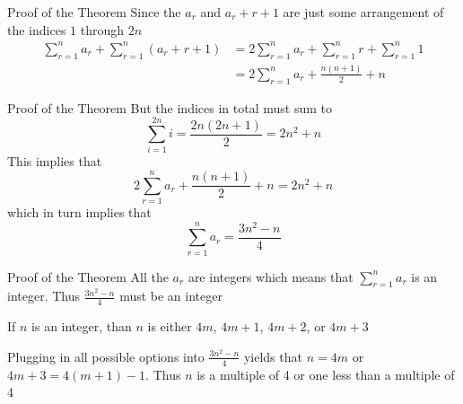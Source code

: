 \documentclass[aspectratio=169, handout]{beamer}
\begin{document}
\begin{frame}{Proof of the Theorem}
    Since the $a_r$ and $a_r + r + 1$ are just some arrangement of the indices $1$ through $2n$
    \begin{align*}
        \sum_{r = 1}^n a_r + \sum_{r = 1}^n (a_r + r + 1) &= 2 \sum_{r = 1}^n a_r + \sum_{r = 1}^n r + \sum_{r = 1}^n 1 \\
        &= 2 \sum_{r = 1}^n a_r + \frac{n(n + 1)}{2} + n
    \end{align*}
\end{frame}

\begin{frame}{Proof of the Theorem}
    But the indices in total must sum to
    \[
        \sum_{i = 1}^{2n} i = \frac{2n(2n + 1)}{2} = 2n^2 + n
    \] \pause
    This implies that
    \[
        2 \sum_{r = 1}^n a_r + \frac{n(n + 1)}{2} + n = 2n^2 + n
    \] \pause
    which in turn implies that
    \[
        \sum_{r = 1}^n a_r = \frac{3n^2 - n}{4}
    \]
\end{frame}

\begin{frame}{Proof of the Theorem}
    All the $a_r$ are integers which means that $\sum_{r = 1}^n a_r$ is an integer. Thus $\frac{3n^2 - n}{4}$ must be an integer
    \vspace{20pt}
    \pause
    
    If $n$ is an integer, than $n$ is either $4m$, $4m + 1$, $4m + 2$, or $4m + 3$
    \vspace{20pt}
    \pause
    
    Plugging in all possible options into $\frac{3n^2 - n}{4}$ yields that $n = 4m$ or $4m + 3 = 4(m + 1) - 1$. Thus $n$ is a multiple of 4 or one less than a multiple of 4
\end{frame}
\end{document}
